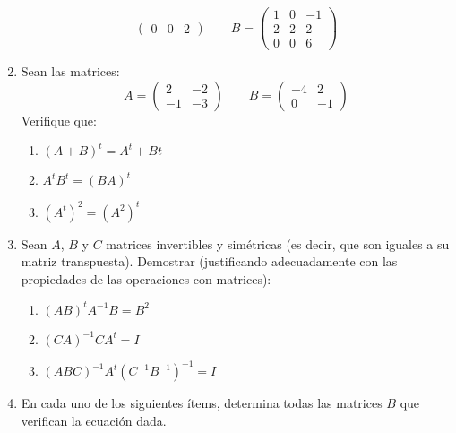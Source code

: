 \documentclass[12pt]{article}
\begin{document}
\begin{enumerate}
$$\begin{pmatrix}
0 & 0 & 2
\end{pmatrix} \qquad B=\begin{pmatrix}
1 & 0 & -1\\
2 & 2 & 2\\
0 & 0 & 6
\end{pmatrix}
$$
\item Sean las matrices:
$$
A=\begin{pmatrix}
2 & -2 \\
-1 & -3
\end{pmatrix} \qquad B=\begin{pmatrix}
-4 & 2\\
0 & -1
\end{pmatrix}
$$
Verifique que:
\begin{multicols}{3}
\begin{enumerate}
  \item $(A+B)^t = A^t+B t$
  \item $A^tB^t = (BA)^t$
  \item $(A^t)^2 = (A^2)^t$
\end{enumerate}
\end{multicols}
\item Sean $A$, $B$ y $C$ matrices invertibles y simétricas (es decir, que son iguales a su matriz transpuesta). Demostrar
(justificando adecuadamente con las propiedades de las operaciones con matrices):
\begin{enumerate}
  \item $(AB)^tA^{-1}B = B^2$
  \item $(CA)^{-1}CA^t = I$
  \item $(ABC)^{-1}A^t(C^{-1}B^{-1})^{-1} = I$
\end{enumerate}
\item En cada uno de los siguientes ítems, determina todas las matrices $B$ que verifican la ecuación dada.
\end{enumerate}
\end{document}
